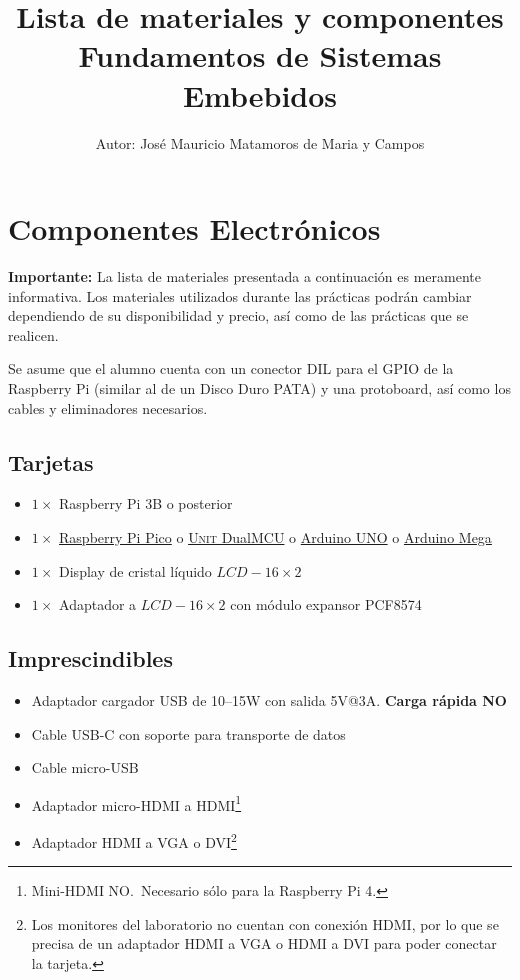 \documentclass[letterpaper,10.5pt]{article}
\author{\footnotesize Autor: José Mauricio Matamoros de Maria y Campos}
\title{Lista de materiales y componentes\\
{\large Fundamentos de Sistemas Embebidos}}
\date{}
\begin{document}
\maketitle

\section{Componentes Electrónicos}

\noindent
\textbf{Importante:} La lista de materiales presentada a continuación es meramente informativa.
Los materiales utilizados durante las prácticas podrán cambiar dependiendo de su disponibilidad y precio, así como de las prácticas que se realicen.

Se asume que el alumno cuenta con un conector DIL para el GPIO de la Raspberry Pi (similar al de un Disco Duro PATA) y una protoboard, así como los cables y eliminadores necesarios.


\subsection{Tarjetas}
\begin{itemize}[nosep]
	\item $1\times$ Raspberry Pi 3B o posterior\footnotemark{}
	\item $1\times$
		\href{https://es.aliexpress.com/item/1005005630743750.html}{Raspberry Pi Pico} o
		\href{https://uelectronics.com/producto/unit-dualmcu-esp32-rp2040-tarjeta-de-desarrollo/}{\textsc{Unit} DualMCU} o
		\href{https://sandorobotics.com/producto/sd-a066/}{Arduino UNO} o
		\href{https://sandorobotics.com/producto/sd-a067/}{Arduino Mega}
	\item $1\times$ Display de cristal líquido $LCD-16\times2$
	\item $1\times$ Adaptador \IIC{} a $LCD-16\times2$ con módulo expansor PCF8574
\end{itemize}

\subsection{Imprescindibles}
\begin{itemize}[nosep]
	\item Adaptador cargador USB de 10--15W con salida 5V@3A. \textbf{Carga rápida NO}
	\item Cable USB-C con soporte para transporte de datos
	\item Cable micro-USB %
	\item Adaptador micro-HDMI a HDMI\footnote{
		Mini-HDMI NO.~Necesario sólo para la Raspberry Pi 4.
	}
	\item Adaptador HDMI a VGA o DVI\footnote{
		Los monitores del laboratorio no cuentan con conexión HDMI, por lo que se precisa de un adaptador HDMI a VGA o  HDMI a DVI para poder conectar la tarjeta.
	}
\end{itemize}
\end{document}
